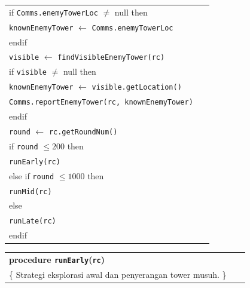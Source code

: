 \documentclass{article}
\newenvironment{pseudobox}
{
\centering
\begin{longtable}{|p{0.94\linewidth}|}
\hline
}
{
\\ \hline
\end{longtable}
\vspace{0.05cm}
}
\begin{document}
\begin{enumerate}[label=\alph*.]
\begin{pseudobox}
\hspace*{1.5em}if \texttt{Comms.enemyTowerLoc} $\neq$ null then \\
\hspace*{3em}\texttt{knownEnemyTower} $\leftarrow$ \texttt{Comms.enemyTowerLoc} \\
\hspace*{1.5em}endif \\

\hspace*{1.5em}\texttt{visible} $\leftarrow$ \texttt{findVisibleEnemyTower(rc)} \\

\hspace*{1.5em}if \texttt{visible} $\neq$ null then \\
\hspace*{3em}\texttt{knownEnemyTower} $\leftarrow$ \texttt{visible.getLocation()} \\
\hspace*{3em}\texttt{Comms.reportEnemyTower(rc, knownEnemyTower)} \\
\hspace*{1.5em}endif \\

\hspace*{1.5em}\texttt{round} $\leftarrow$ \texttt{rc.getRoundNum()} \\

\hspace*{1.5em}if \texttt{round} $\leq 200$ then \\
\hspace*{3em}\texttt{runEarly(rc)} \\

\hspace*{1.5em}else if \texttt{round} $\leq 1000$ then \\
\hspace*{3em}\texttt{runMid(rc)} \\

\hspace*{1.5em}else \\
\hspace*{3em}\texttt{runLate(rc)} \\
\hspace*{1.5em}endif
\end{pseudobox}

\begin{pseudobox}

\textbf{procedure \texttt{runEarly}(\texttt{rc})} \\
\{ Strategi eksplorasi awal dan penyerangan tower musuh. \}


\end{pseudobox}
\end{enumerate}
\end{document}
